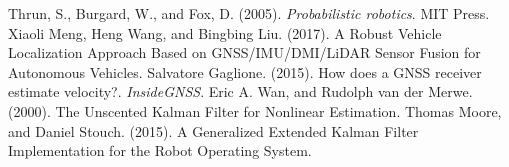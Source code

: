 \documentclass[10pt,a4paper, twocolumn]{article}
\begin{document}
\begin{thebibliography}{}
        Thrun, S., Burgard, W., and Fox, D. (2005). \textit{Probabilistic robotics}. MIT Press.
        Xiaoli Meng, Heng Wang, and Bingbing Liu. (2017). A Robust Vehicle Localization Approach Based on GNSS/IMU/DMI/LiDAR Sensor Fusion for Autonomous Vehicles.    
	Salvatore Gaglione. (2015). How does a GNSS receiver estimate velocity?. \textit{InsideGNSS}.
	Eric A. Wan, and Rudolph van der Merwe. (2000). The Unscented Kalman Filter for Nonlinear Estimation.
	Thomas Moore, and Daniel Stouch. (2015). A Generalized Extended Kalman Filter Implementation for the Robot Operating System.
\end{thebibliography}
\end{document}
